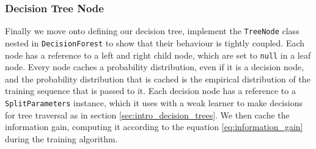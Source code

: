 \documentclass[12pt,twoside,notitlepage]{report}
\begin{document}
            \subsubsection{Decision Tree Node}
                Finally we move onto defining our decision tree, implement the \texttt{TreeNode} class nested in 
                \texttt{DecisionForest} to show that their behaviour is tightly coupled. Each node has a reference 
                to a left and right child node, which are set to \texttt{null} in a leaf node. Every node caches a 
                probability distribution, even if it is a decision node, and the 
                probability distribution that is cached is the empirical distribution of the training sequence that is 
                passed to it. Each decision node has a reference to a \texttt{SplitParameters} instance, which it 
                uses with a weak learner to make decisions for tree traversal as in section 
                \ref{sec:intro_decision_trees}. We then cache the information gain, computing it according to the 
                equation \ref{eq:information_gain} during the training algorithm.
\end{document}
